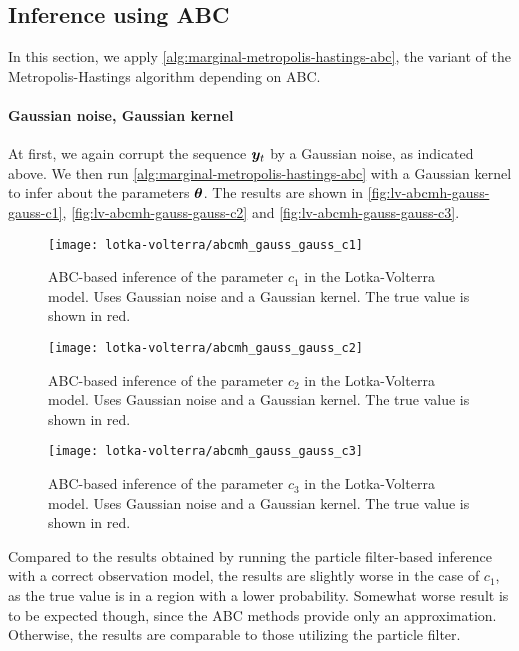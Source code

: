 \subsection{Inference using ABC}
In this section, we apply \autoref{alg:marginal-metropolis-hastings-abc}, the variant of the Metropolis-Hastings algorithm depending on ABC.

\paragraph{Gaussian noise, Gaussian kernel}
At first, we again corrupt the sequence $\bm{y}_t$ by a Gaussian noise, as indicated above. We then run \autoref{alg:marginal-metropolis-hastings-abc} with a Gaussian kernel to infer about the parameters $\bm{\theta}$. The results are shown in \autoref{fig:lv-abcmh-gauss-gauss-c1}, \autoref{fig:lv-abcmh-gauss-gauss-c2} and \autoref{fig:lv-abcmh-gauss-gauss-c3}.

\begin{figure}[htp]
    \centering
    \texttt{[image: lotka-volterra/abcmh\_gauss\_gauss\_c1]}
    \caption{ABC-based inference of the parameter $c_1$ in the Lotka-Volterra model. Uses Gaussian noise and a Gaussian kernel. The true value is shown in red.}
    \label{fig:lv-abcmh-gauss-gauss-c1}
\end{figure}

\begin{figure}[htp]
    \centering
    \texttt{[image: lotka-volterra/abcmh\_gauss\_gauss\_c2]}
    \caption{ABC-based inference of the parameter $c_2$ in the Lotka-Volterra model. Uses Gaussian noise and a Gaussian kernel. The true value is shown in red.}
    \label{fig:lv-abcmh-gauss-gauss-c2}
\end{figure}

\begin{figure}[htp]
    \centering
    \texttt{[image: lotka-volterra/abcmh\_gauss\_gauss\_c3]}
    \caption{ABC-based inference of the parameter $c_3$ in the Lotka-Volterra model. Uses Gaussian noise and a Gaussian kernel. The true value is shown in red.}
    \label{fig:lv-abcmh-gauss-gauss-c3}
\end{figure}

Compared to the results obtained by running the particle filter-based inference with a correct observation model, the results are slightly worse in the case of $c_1$, as the true value is in a region with a lower probability. Somewhat worse result is to be expected though, since the ABC methods provide only an approximation. Otherwise, the results are comparable to those utilizing the particle filter.



